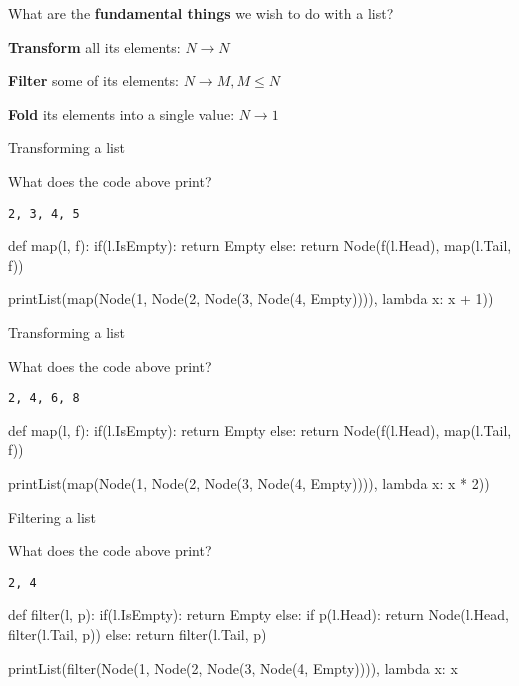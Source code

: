 \documentclass{beamer}
\begin{document}
\begin{slide}{
\item What are the \textbf{fundamental things} we wish to do with a list?
\pause
\item \textbf{Transform} all its elements: $N \rightarrow N$
\pause
\item \textbf{Filter} some of its elements: $N \rightarrow M, M \leq N$
\pause
\item \textbf{Fold} its elements into a single value: $N \rightarrow 1$
}\end{slide}

\begin{frame}[fragile]{Transforming a list}
\begin{codewithblock}{\item What does the code above print? \pause \item \texttt{2, 3, 4, 5}}
def map(l, f):
  if(l.IsEmpty):
    return Empty
  else:
    return Node(f(l.Head), map(l.Tail, f))

printList(map(Node(1, Node(2, Node(3, Node(4, Empty)))), lambda x: x + 1))
\end{codewithblock}
\end{frame}

\begin{frame}[fragile]{Transforming a list}
\begin{codewithblock}{\item What does the code above print? \pause \item \texttt{2, 4, 6, 8}}
def map(l, f):
  if(l.IsEmpty):
    return Empty
  else:
    return Node(f(l.Head), map(l.Tail, f))

printList(map(Node(1, Node(2, Node(3, Node(4, Empty)))), lambda x: x * 2))
\end{codewithblock}
\end{frame}

\begin{frame}[fragile]{Filtering a list}
\begin{codewithblock}{\item What does the code above print? \pause \item \texttt{2, 4}}
def filter(l, p):
  if(l.IsEmpty):
    return Empty
  else:
    if p(l.Head):
      return Node(l.Head, filter(l.Tail, p))
    else:
      return filter(l.Tail, p)

printList(filter(Node(1, Node(2, Node(3, Node(4, Empty)))), lambda x: x %
\end{codewithblock}
\end{frame}
\end{document}
